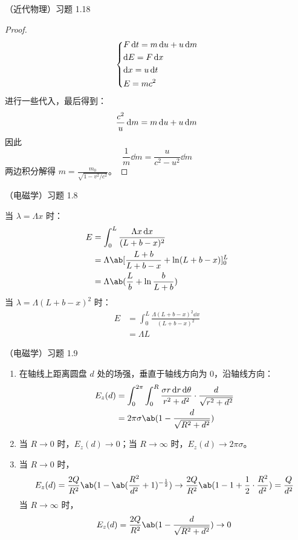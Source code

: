 \begin{problem}
	（近代物理）习题 1.18
	\begin{proof}
		$$
		\begin{dcases}
			F \dd{t} = m \dd{u} + u \dd{m} \\
			\dd{E} = F \dd{x} \\
			\dd{x} = u \dd{t} \\
			E = m c^2
		\end{dcases}
		$$
		进行一些代入，最后得到：
		$$
		\frac{c^2}{u} \dd{m} = m \dd{u} + u \dd{m} \\
		$$
		因此
		$$
		\frac{1}{m} \dd{m} = \frac{u}{c^2 - u^2} \dd{m}
		$$
		两边积分解得 $m = \frac{m_0}{\sqrt{1 - v^2 / c^2}}$。
	\end{proof}
\end{problem}

\begin{problem}
	（电磁学）习题 1.8
	\begin{solution}
		当 $\lambda = \Lambda x$ 时：
		$$
		\begin{aligned}
			E & = \int_{0}^{L} \frac{\Lambda x \dd{x}}{(L + b - x)^2} \\
			& = \Lambda \ab[\frac{L + b}{L + b - x} + \ln (L + b - x)]_0^L \\
			& = \Lambda \ab(\frac{L}{b} + \ln \frac{b}{L + b})
		\end{aligned}
		$$
		当 $\lambda = \Lambda (L + b - x)^2$ 时：
		$$
		\begin{aligned}
			E & = \int_{0}^{L} \frac{\Lambda (L + b - x)^2 \dd{x}}{(L + b - x)^2} \\
			& = \Lambda L
		\end{aligned}
		$$
	\end{solution}
\end{problem}

\begin{problem}
	（电磁学）习题 1.9
	\begin{solution}
		\begin{enumerate}
			\item[\textbf{1)}] 在轴线上距离圆盘 $d$ 处的场强，垂直于轴线方向为 $0$，沿轴线方向：
			$$
			\begin{aligned}
				E_z(d) & = \int_0^{2\pi} \int_0^R \frac{\sigma r \dd{r} \dd{\theta}}{r^2 + d^2} \cdot \frac{d}{\sqrt{r^2 + d^2}} \\
				& = 2 \pi \sigma \ab(1 - \frac{d}{\sqrt{R^2 + d^2}})
			\end{aligned}
			$$
			\item[\textbf{2)}] 当 $R \to 0$ 时，$E_z(d) \to 0$；当 $R \to \infty$ 时，$E_z(d) \to 2 \pi \sigma$。
			\item[\textbf{3)}] 当 $R \to 0$ 时，
			$$
			E_z(d) = \frac{2Q}{R^2} \ab(1 - \ab(\frac{R^2}{d^2} + 1)^{-\frac{1}{2}}) \to \frac{2Q}{R^2}\ab(1 - 1 + \frac{1}{2} \cdot \frac{R^2}{d^2}) = \frac{Q}{d^2}
			$$
			当 $R \to \infty$ 时，
			$$
			E_z(d) = \frac{2Q}{R^2} \ab(1 - \frac{d}{\sqrt{R^2 + d^2}}) \to 0
			$$
		\end{enumerate}
	\end{solution}
\end{problem}

